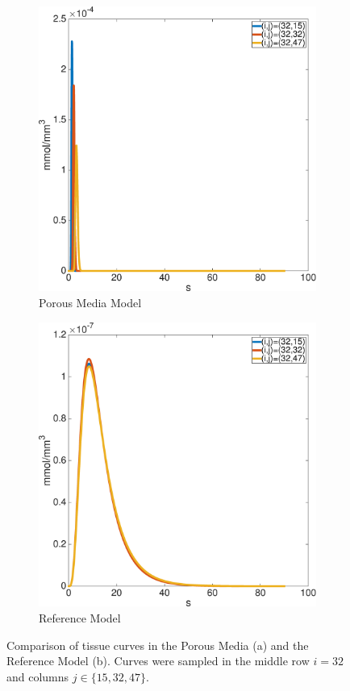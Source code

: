 \documentclass[paper=a4, fontsize=11pt,parskip=half,headings=small]{scrartcl}
\begin{document}
	\begin{figure}[H]
		\centering
		\begin{subfigure}[b]{0.45\textwidth}
			\includegraphics[width=\textwidth]{figs/PM153247.eps}
			\caption{Porous Media Model}
		\end{subfigure}
		\begin{subfigure}[b]{0.45\textwidth}
			\includegraphics[width=\textwidth]{figs/RM153247.eps}			
			\caption{Reference Model}			
		\end{subfigure}		
		\caption{Comparison of tissue curves in the Porous Media (a) and the Reference Model (b). Curves were sampled in the middle row $i=32$ and columns $j \in \{15,32,47\}$.}
		\label{fig:tissuecomp}
	\end{figure}
	
\end{document}
